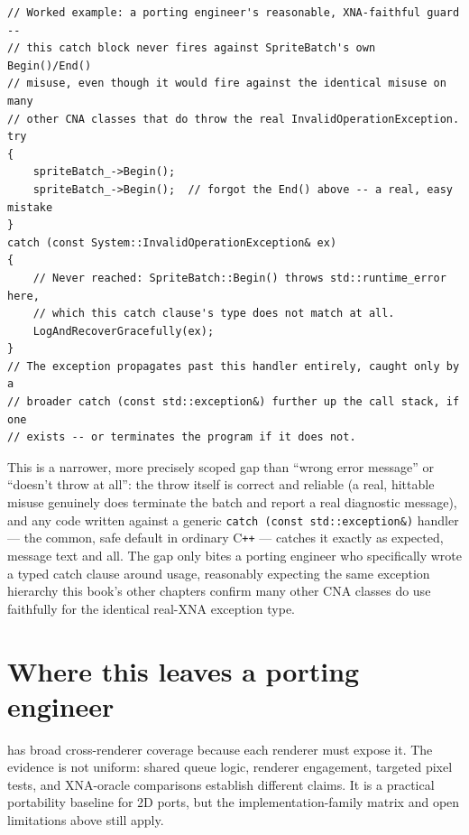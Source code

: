 \begin{lstlisting}
// Worked example: a porting engineer's reasonable, XNA-faithful guard --
// this catch block never fires against SpriteBatch's own Begin()/End()
// misuse, even though it would fire against the identical misuse on many
// other CNA classes that do throw the real InvalidOperationException.
try
{
    spriteBatch_->Begin();
    spriteBatch_->Begin();  // forgot the End() above -- a real, easy mistake
}
catch (const System::InvalidOperationException& ex)
{
    // Never reached: SpriteBatch::Begin() throws std::runtime_error here,
    // which this catch clause's type does not match at all.
    LogAndRecoverGracefully(ex);
}
// The exception propagates past this handler entirely, caught only by a
// broader catch (const std::exception&) further up the call stack, if one
// exists -- or terminates the program if it does not.
\end{lstlisting}

This is a narrower, more precisely scoped gap than ``wrong error message'' or ``doesn't throw at
all'': the throw itself is correct and reliable (a real, hittable misuse genuinely does
terminate the batch and report a real diagnostic message), and any code written against a
generic \texttt{catch (const std::exception\&)} handler --- the common, safe default in
ordinary C\texttt{++} --- catches it exactly as expected, message text and all. The gap only
bites a porting engineer who specifically wrote a typed 
catch clause around  usage, reasonably expecting the same exception
hierarchy this book's other chapters confirm many other CNA classes do use faithfully for the
identical real-XNA exception type.

\section{Where this leaves a porting engineer}

 has broad cross-renderer coverage because each renderer must expose it.
The evidence is not uniform: shared queue logic, renderer engagement, targeted pixel tests, and
XNA-oracle comparisons establish different claims. It is a practical portability baseline for
2D ports, but the implementation-family matrix and open limitations above still apply.
